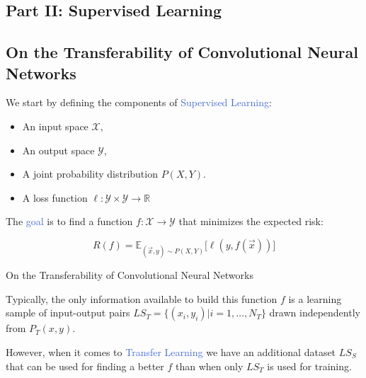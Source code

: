 \documentclass{beamer}
\begin{document}
\begin{frame}
	\section{Part II: Supervised Learning}
	\subsection{On the Transferability of Convolutional Neural Networks}

	We start by defining the components of \textcolor{RoyalBlue}{Supervised Learning}:

	\begin{itemize}
		\item An input space $\mathcal{X}$,
		\item An output space $\mathcal{Y}$,
		\item A joint probability distribution $P(X,Y)$.
		\item A loss function $\ell: \mathcal{Y} \times \mathcal{Y} \rightarrow \mathds{R}$
	\end{itemize}

	\bigskip

	The \textcolor{RoyalBlue}{goal} is to find a function $f:\mathcal{X}\rightarrow\mathcal{Y}$ that minimizes the expected risk:

	\begin{equation*}
		R(f) = \mathds{E}_{(\vec{x},y)\sim P(X,Y)} \big[\ell(y,f(\vec{x}))\big]
	\end{equation*}
\end{frame}

\begin{frame}{On the Transferability of Convolutional Neural Networks}

	Typically, the only information available to build this function $f$ is a learning sample of input-output pairs $LS_T=\{(x_i,y_i)|i=1,\ldots,N_T\}$ drawn independently from $P_T(x,y)$.

	\bigskip

	However, when it comes to \textcolor{RoyalBlue}{Transfer Learning} we have an additional dataset $LS_S$ that can be used for finding a better $f$ than when only $LS_T$ is used for training. 

\end{frame}
\end{document}
